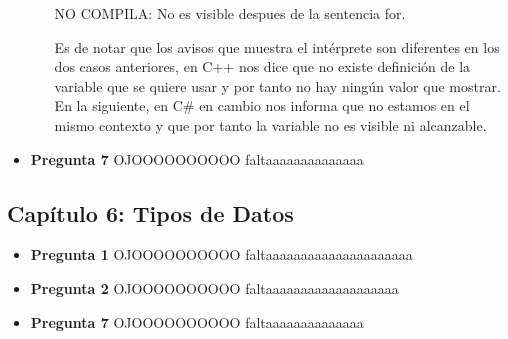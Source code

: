 \documentclass[12pt,oneside]{article}
\begin{document}
\begin{itemize}
\begin{itemize}
\begin{center}
								NO COMPILA: No es visible despues de la sentencia for.
							\end{center}
							Es de notar que los avisos que muestra el intérprete son diferentes en los dos casos anteriores, en C++ nos dice que no existe definición de la variable que se quiere usar y por tanto no hay ningún valor que mostrar. En la 									siguiente, en C\# en cambio nos informa que no estamos en el mismo contexto y que por tanto la variable no es visible ni alcanzable.
					\end{itemize}
				\item {\bf Pregunta 7}	
					OJOOOOOOOOOO faltaaaaaaaaaaaaaa
		\end{itemize}


		\subsection{Capítulo 6: Tipos de Datos}
			\begin{itemize}
				\item {\bf Pregunta 1}
					OJOOOOOOOOOO faltaaaaaaaaaaaaaaaaaaaaa
				\item {\bf Pregunta 2}
					OJOOOOOOOOOO faltaaaaaaaaaaaaaaaaaaa
				\item {\bf Pregunta 7}
					OJOOOOOOOOOO faltaaaaaaaaaaaaaa
				\end{itemize}
\end{document}

